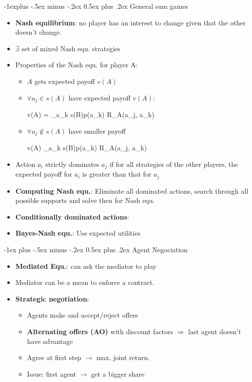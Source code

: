 \documentclass[10pt,a4paper,landscape]{article}
\makeatletter
\renewcommand{\section}{\@startsection{section}{1}{0mm}%
                                {-1ex plus -.5ex minus -.2ex}%
                                {0.5ex plus .2ex}%
                                {\normalfont\small\bfseries}}
\renewcommand{\subsection}{\@startsection{subsection}{2}{0mm}%
                                {-1explus -.5ex minus -.2ex}%
                                {0.5ex plus .2ex}%
                                {\normalfont\small\bfseries}}
\newenvironment{myalign*}{%
  \setlength{\abovedisplayskip}{3pt}%
  \setlength{\belowdisplayskip}{3pt}%
  \start@align\@ne\st@rredtrue\m@ne
}%
{\endalign}
\makeatother
\begin{document}
\begin{multicols*}{2}
\subsection{General sum games}
\begin{itemize}
	\item \textbf{Nash equilibrium}: no player has an interest to change given that the other doesn't change.
	\item $\exists$ set of mixed Nash equ. strategies
	\item Properties of the Nash equ. for player A:
	\begin{itemize}
		\item $A$ gets expected payoff $v(A)$
		\item $\forall a_j \in s(A)$ have expected payoff $v(A)$:
		\begin{myalign*}
		    v(A) = \sum_{a_k \in s(B)}p(a_k) R_A(a_j, a_k) 
		\end{myalign*}
		\item $\forall a_j \not\in s(A)$ have smaller payoff
		\begin{myalign*}
		    v(A) \geq \sum_{a_k \in s(B)}p(a_k) R_A(a_j, a_k)
		\end{myalign*}
	\end{itemize}
	\item Action $a_i$ strictly dominates $a_j$ if for all strategies of the other players, the expected payoff for $a_i$ is greater than that for $a_j$
	\item \textbf{Computing Nash equ.}: Eliminate all dominated actions, search through all possible supports and solve then for Nash equ.
	\item \textbf{Conditionally dominated actions}: 
	\item \textbf{Bayes-Nash equ.}: Use expected utilities
	
\end{itemize}

\section{Agent Negociation}
\begin{itemize}
	\item \textbf{Mediated Equ.}: can ask the mediator to play 
	\item Mediator can be a mean to enforce a contract.

	\item \textbf{Strategic negotiation}:
	\begin{itemize}
	 	\item Agents make and accept/reject offers
	 	\item \textbf{Alternating offers (AO)} with discount factors
	 	$\Rightarrow$ last agent doesn't have advantage
	 	\item Agree at first step $\rightarrow$ max. joint return.
	 	\item Issue: first agent $\rightarrow$ get a bigger share
	 \end{itemize}


\end{itemize}
\end{multicols*}
\end{document}
